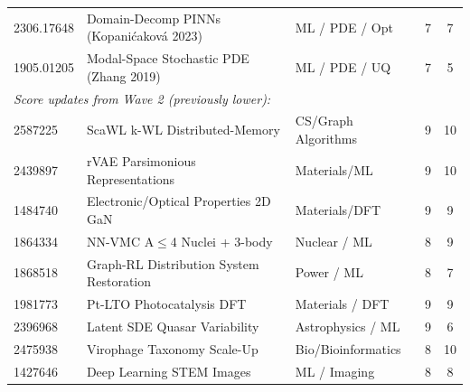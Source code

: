 \begin{longtable}{lllcc}
2306.17648 & Domain-Decomp PINNs (Kopani\'cakov\'a 2023) & ML / PDE / Opt & 7 & 7 \\
1905.01205 & Modal-Space Stochastic PDE (Zhang 2019) & ML / PDE / UQ & 7 & 5 \\
\midrule
\multicolumn{3}{l}{\textit{Score updates from Wave 2 (previously lower):}} & & \\
2587225 & ScaWL k-WL Distributed-Memory & CS/Graph Algorithms & 9 & 10 \\
2439897 & rVAE Parsimonious Representations & Materials/ML & 9 & 10 \\
1484740 & Electronic/Optical Properties 2D GaN & Materials/DFT & 9 & 9 \\
1864334 & NN-VMC A$\leq$4 Nuclei + 3-body & Nuclear / ML & 8 & 9 \\
1868518 & Graph-RL Distribution System Restoration & Power / ML & 8 & 7 \\
1981773 & Pt-LTO Photocatalysis DFT & Materials / DFT & 9 & 9 \\
2396968 & Latent SDE Quasar Variability & Astrophysics / ML & 9 & 6 \\
2475938 & Virophage Taxonomy Scale-Up & Bio/Bioinformatics & 8 & 10 \\
1427646 & Deep Learning STEM Images & ML / Imaging & 8 & 8 \\
\bottomrule\end{longtable}
